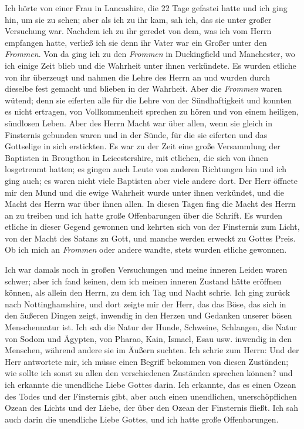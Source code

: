 Ich hörte von einer Frau in Lancashire, die 22 Tage gefastei 
hatte und ich ging hin, um sie zu sehen; aber als ich zu
ihr kam, sah ich, das sie unter großer Versuchung war. 
Nachdem ich zu ihr geredet von dem, was ich vom Herrn empfangen
hatte, verließ ich sie denn ihr Vater war ein Großer unter den
\textit{Frommen}. Von da ging ich zu den \textit{Frommen} in Duckingfield
und Manchester, wo ich einige Zeit blieb und die Wahrheit unter
ihnen verkündete. Es wurden etliche von ihr überzeugt und nahmen
die Lehre des Herrn an und wurden durch dieselbe fest gemacht und
blieben in der Wahrheit. Aber die \textit{Frommen} waren wütend;
denn sie eiferten alle für die Lehre von der Sündhaftigkeit und
konnten es nicht ertragen, von Vollkommenheit sprechen zu hören
und von einem heiligen, sündlosen Leben. Aber des Herrn Macht
war über allen, wenn sie gleich in Finsternis gebunden waren
und in der Sünde, für die sie eiferten und das Gottselige in sich
erstickten. Es war zu der Zeit eine große Versammlung der
Baptisten in Brougthon in Leicestershire, mit etlichen, die sich
von ihnen losgetrenmt hatten; es gingen auch Leute von anderen
Richtungen hin und ich ging auch; es waren nicht viele Baptisten
aber viele andere dort. Der Herr öffnete mir den Mund und
die ewige Wahrheit wurde unter ihnen verkündet, und die Macht
des Herrn war über ihnen allen. In diesen Tagen fing die Macht
des Herrn an zu treiben und ich hatte große Offenbarungen über die
Schrift. Es wurden etliche in dieser Gegend gewonnen und kehrten
sich von der Finsternis zum Licht, von der Macht des Satans zu
Gott, und manche werden erweckt zu Gottes Preis. Ob ich mich an
\textit{Frommen} oder andere wandte, stets wurden etliche gewonnen.

Ich war damals noch in großen Versuchungen und meine
inneren Leiden waren schwer; aber ich fand keinen, dem ich meinen
inneren Zustand hätte eröffnen können, als allein den Herrn, zu
dem ich Tag und Nacht schrie. Ich ging zurück nach 
Nottinghamshire, und dort zeigte mir 
der Herr, das das Böse, das sich
in den äußeren Dingen zeigt, inwendig in den Herzen und 
Gedanken unserer bösen Menschennatur ist. Ich sah die Natur der
Hunde, Schweine, Schlangen, die Natur von Sodom und Ägypten,
von Pharao, Kain, Ismael, Esau usw. inwendig in den Menschen,
während andere sie im Äußern suchten. Ich schrie zum Herrn:
 Und der Herr antwortete mir, ich
müsse einen Begriff bekommen von diesen Zuständen; wie sollte
ich sonst zu allen den verschiedenen Zuständen sprechen können?
und ich erkannte die unendliche Liebe Gottes darin. Ich erkannte,
das es einen Ozean des Todes 
und der Finsternis gibt, aber
auch einen unendlichen, unerschöpflichen Ozean des 
Lichts und
der Liebe, der über den Ozean der Finsternis fließt. Ich sah
auch darin die unendliche Liebe Gottes, und ich hatte große
Offenbarungen.

